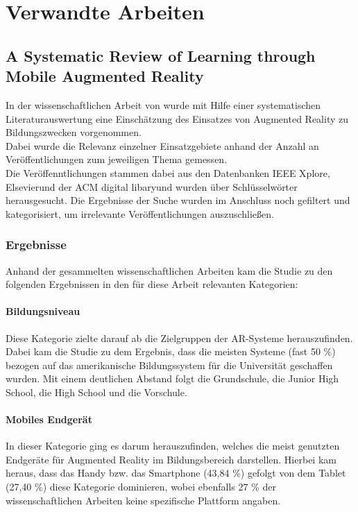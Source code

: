 \chapter{Verwandte Arbeiten}\label{chapter:arbeiten}

\section{A Systematic Review of Learning through Mobile Augmented Reality}
In der wissenschaftlichen Arbeit von \citeauthor{hedberg:review-ar-learning} \citep{hedberg:review-ar-learning} wurde mit Hilfe einer systematischen Literaturauswertung eine Einschätzung des Einsatzes von Augmented Reality zu Bildungszwecken vorgenommen. \\
Dabei wurde die Relevanz einzelner Einsatzgebiete anhand der Anzahl an Veröffentlichungen zum jeweiligen Thema gemessen.\\ Die Veröffenntlichungen stammen dabei aus den Datenbanken \glqq IEEE Xplore\grqq , \glqq Elsevier\grqq und der \glqq ACM digital libary\grqq und wurden über Schlüsselwörter herausgesucht. Die Ergebnisse der Suche wurden im Anschluss noch gefiltert und kategorisiert, um irrelevante Veröffentlichungen auszuschließen.
\subsection{Ergebnisse}
Anhand der gesammelten wissenschaftlichen Arbeiten kam die Studie zu den folgenden Ergebnissen in den für diese Arbeit relevanten Kategorien:

\subsubsection{Bildungsniveau}
Diese Kategorie zielte darauf ab die Zielgruppen der AR-Systeme herauszufinden. Dabei kam die Studie zu dem Ergebnis, dass die meisten Systeme (fast 50 \%) bezogen auf das amerikanische Bildungssystem für die Universität geschaffen wurden. Mit einem deutlichen Abstand folgt die Grundschule, die Junior High School, die High School und die Vorschule.

\subsubsection{Mobiles Endgerät}
In dieser Kategorie ging es darum herauszufinden, welches die meist genutzten Endgeräte für Augmented Reality im Bildungsbereich darstellen. Hierbei kam heraus, dass das Handy bzw. das Smartphone (43,84 \%) gefolgt von dem Tablet (27,40 \%) diese Kategorie dominieren, wobei ebenfalls 27 \% der wissenschaftlichen Arbeiten keine spezifische Plattform angaben.

